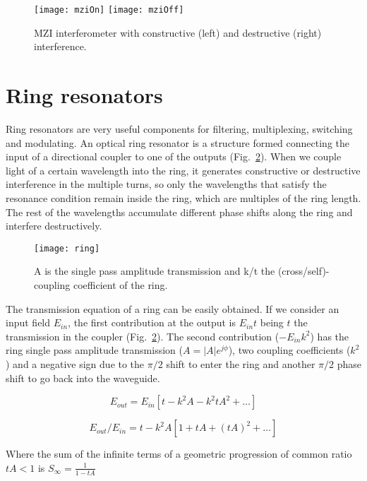 \begin{figure}[htb]
    \centering
    \texttt{[image: mziOn]} \texttt{[image: mziOff]}
      \caption{MZI interferometer with constructive (left) and destructive (right) interference.}
    \label{fig:mziOnOff}
\end{figure}



\section{Ring resonators}
Ring resonators are very useful components for filtering, multiplexing, switching and modulating.
An optical ring resonator is a structure formed connecting the input of a directional coupler to one of the outputs (Fig.~\ref{fig:ringSchematic}).
When we couple light of a certain wavelength into the ring, it generates constructive or destructive interference in the multiple turns, so only the wavelengths that satisfy the resonance condition remain inside the ring, which are multiples of the ring length.
The rest of the wavelengths accumulate different phase shifts along the ring and interfere destructively.

\begin{figure}[htb]
    \centering
    \texttt{[image: ring]}
    \caption{A is the single pass amplitude transmission and k/t the (cross/self)-coupling coefficient of the ring.}
    \label{fig:ringSchematic}
\end{figure}

The transmission equation of a ring can be easily obtained. If we consider an input field $E_{in}$, the first contribution at the output is $E_{in} t$ being $t$ the transmission in the coupler (Fig.~\ref{fig:ringSchematic}).
The second contribution ($-E_{in} k^2$) has the ring single pass amplitude transmission ($A=|A| e^{j\phi}$), two coupling coefficients ($k^2$) and a negative sign due to the $\pi/2$ shift to enter the ring and another $\pi/2$ phase shift to go back into the waveguide.

\begin{equation}
	E_{out}=E_{in}[t-k^2A-k^2tA^2 + \ldots]
\end{equation} 

\begin{equation}
	E_{out}/E_{in}=t-k^2A[1+tA + (tA)^2 +  \ldots]
\end{equation} 

Where the sum of the infinite terms of a geometric progression of common ratio $tA<1$ is $ S_\infty = \frac{1}{1-tA} $


